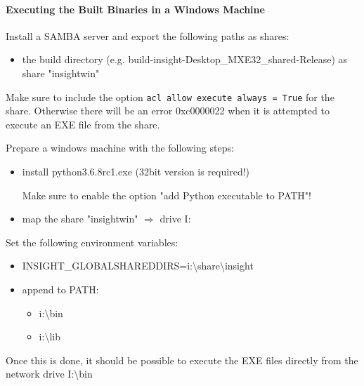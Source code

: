\paragraph{Executing the Built Binaries in a Windows Machine}

Install a SAMBA server and export the following paths as shares:
\begin{itemize}
\item the build directory (e.g. build-insight-Desktop\_MXE32\_shared-Release) as share "insightwin"
\end{itemize}
Make sure to include the option \texttt{acl allow execute always = True} for the share.
Otherwise there will be an error 0xc0000022 when it is attempted to execute an EXE file from the share.\warningsymbol

Prepare a windows machine with the following steps:
\begin{itemize}
\item install python3.6.8rc1.exe (32bit version is required!)

Make sure to enable the option "add Python executable to PATH"! \warningsymbol

\item map the share "insightwin" $\Rightarrow$ drive I:
\end{itemize}

Set the following environment variables:
\begin{itemize}
\item INSIGHT\_GLOBALSHAREDDIRS=i:\textbackslash{}share\textbackslash{}insight
\item append to PATH: 
\begin{itemize}
\item i:\textbackslash{}bin
\item i:\textbackslash{}lib
\end{itemize}
\end{itemize}



Once this is done, it should be possible to execute the EXE files directly from the network drive I:\textbackslash{}bin



